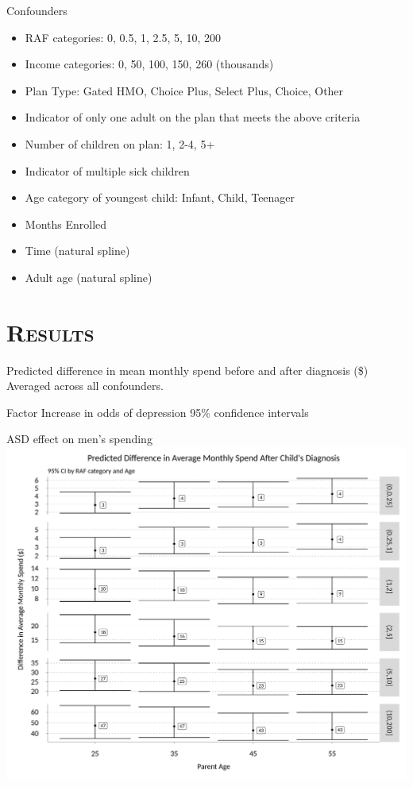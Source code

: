 \documentclass[xcolor=x11names,compress]{beamer}
\renewcommand{\(}{\begin{columns}}
\renewcommand{\)}{\end{columns}}
\newcommand{\<}[1]{\begin{column}{#1}}
\renewcommand{\>}{\end{column}}
\begin{document}
\begin{frame}{Confounders}
\begin{itemize}
	\item RAF categories: 0, 0.5, 1, 2.5, 5, 10, 200 
	\item Income categories: 0, 50, 100, 150, 260 (thousands)
	\item Plan Type: Gated HMO, Choice Plus, Select Plus, Choice, Other
	\item Indicator of only one adult on the plan that meets the above criteria 
	\item Number of children on plan: 1, 2-4, 5+
	\item Indicator of multiple sick children
	\item Age category of youngest child: Infant, Child, Teenager
	\item Months Enrolled
	\item Time (natural spline)
	\item Adult age (natural spline)
\end{itemize}  
\end{frame}

\section{\scshape Results}

\begin{frame}{Predicted difference in mean monthly spend before and after diagnosis (\$)}
Averaged across all confounders.

\end{frame}

\begin{frame}{Factor Increase in odds of depression }
95\% confidence intervals

\end{frame}

\begin{frame}{ASD effect on men's spending}
\includegraphics[width=.75\linewidth]{../figures/predicted_spend_male_ASD.png}
\end{frame}
\end{document}
